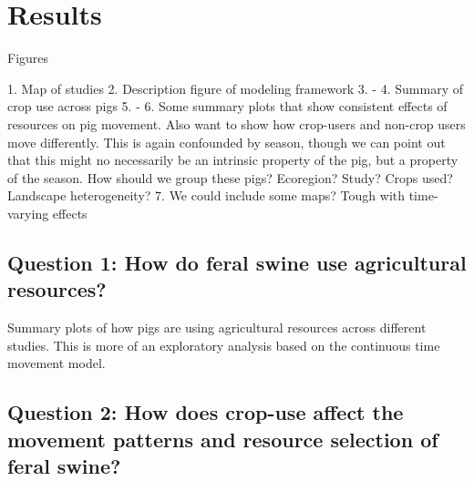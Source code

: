 \documentclass[a4paper]{article}
\begin{document}




\section*{Results}

Figures 

1. Map of studies
2. Description figure of modeling framework
3. - 4. Summary of crop use across pigs
5. - 6. Some summary plots that show consistent effects of resources on pig movement. Also want to show how crop-users and non-crop users move differently. 
This is again confounded by season, though we can point out that this might no necessarily be an intrinsic property of the pig, but a property of the season.  How should we group these pigs? Ecoregion? Study? Crops used? Landscape heterogeneity?
7. We could include some maps? Tough with time-varying effects

\subsection*{Question 1: How do feral swine use agricultural resources?}

Summary plots of how pigs are using agricultural resources across different studies. This is more of an exploratory analysis based on the continuous time
movement model. 

\subsection*{Question 2: How does crop-use affect the movement patterns and resource selection of feral swine?}

\end{document}
